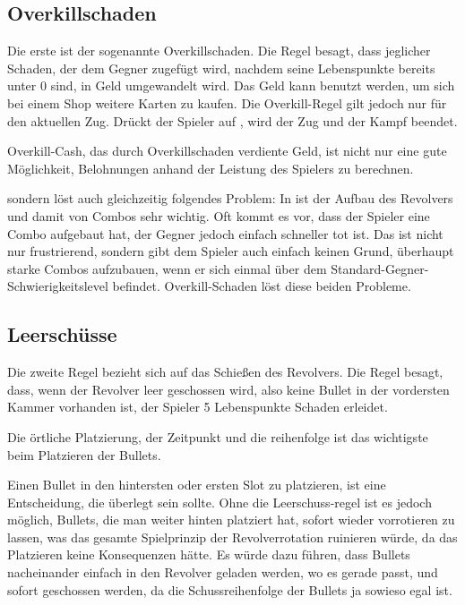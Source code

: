 \subsection{Overkillschaden}\label{Overkill}

Die erste ist der sogenannte Overkillschaden.
Die Regel besagt, dass jeglicher Schaden, der dem Gegner zugefügt wird, nachdem seine Lebenspunkte bereits unter 0 sind,
in Geld umgewandelt wird. Das Geld kann benutzt werden, um sich bei einem Shop weitere Karten zu kaufen.
Die Overkill-Regel gilt jedoch nur für den aktuellen Zug. Drückt der Spieler auf , wird der Zug und der Kampf beendet.


Overkill-Cash, das durch Overkillschaden verdiente Geld, ist nicht nur eine gute Möglichkeit, Belohnungen anhand der Leistung des Spielers zu berechnen.


sondern löst auch gleichzeitig folgendes Problem: In \FF ist der Aufbau des Revolvers und damit von Combos sehr wichtig.
Oft kommt es vor, dass der Spieler eine Combo aufgebaut hat, der Gegner jedoch einfach schneller tot ist.
Das ist nicht nur frustrierend, sondern gibt dem Spieler auch einfach keinen Grund, überhaupt starke Combos aufzubauen,
wenn er sich einmal über dem Standard-Gegner-Schwierigkeitslevel befindet. Overkill-Schaden löst diese beiden Probleme.


\subsection{Leerschüsse}\label{leerschüsse}

Die zweite Regel bezieht sich auf das Schießen des Revolvers.
Die Regel besagt, dass, wenn der Revolver leer geschossen wird, also keine Bullet in der vordersten Kammer vorhanden ist,
der Spieler 5 Lebenspunkte Schaden erleidet.

Die örtliche Platzierung, der Zeitpunkt und die reihenfolge ist das wichtigste beim Platzieren der Bullets.

Einen Bullet in den hintersten oder ersten Slot zu platzieren, ist eine Entscheidung, die überlegt sein sollte.
Ohne die Leerschuss-regel ist es jedoch möglich, Bullets, die man weiter hinten platziert hat, sofort wieder vorrotieren zu lassen,
was das gesamte Spielprinzip der Revolverrotation ruinieren würde, da das Platzieren keine Konsequenzen hätte.
Es würde dazu führen, dass Bullets nacheinander einfach in den Revolver geladen werden, wo es gerade passt, und sofort
geschossen werden, da die Schussreihenfolge der Bullets ja sowieso egal ist.



